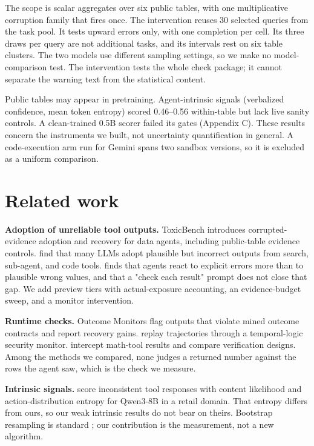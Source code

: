 \documentclass[letterpaper]{article}
\begin{document}
The scope is scalar aggregates over six public tables, with one multiplicative corruption family that fires once. The intervention reuses 30 selected queries from the task pool. It tests upward errors only, with one completion per cell. Its three draws per query are not additional tasks, and its intervals rest on six table clusters. The two models use different sampling settings, so we make no model-comparison test. The intervention tests the whole check package; it cannot separate the warning text from the statistical content.


Public tables may appear in pretraining. Agent-intrinsic signals (verbalized confidence, mean token entropy) scored 0.46--0.56 within-table but lack live sanity controls. A clean-trained 0.5B scorer failed its gates (Appendix C). These results concern the instruments we built, not uncertainty quantification in general. A code-execution arm run for Gemini spans two sandbox versions, so it is excluded as a uniform comparison.


\section{Related work}

\textbf{Adoption of unreliable tool outputs.} ToxicBench \citep{TaoYin2026} introduces corrupted-evidence adoption and recovery for data agents, including public-table evidence controls. \citet{Overreliance} find that many LLMs adopt plausible but incorrect outputs from search, sub-agent, and code tools. \citet{LoudQuietFailures} finds that agents react to explicit errors more than to plausible wrong values, and that a "check each result" prompt does not close that gap. We add preview tiers with actual-exposure accounting, an evidence-budget sweep, and a monitor intervention.


\textbf{Runtime checks.} Outcome Monitors \citep{OutcomeMonitors} flag outputs that violate mined outcome contracts and report recovery gains. \citet{FormalRuntimeVerification} replay trajectories through a temporal-logic security monitor. \citet{MathAgentsCorrupted} intercept math-tool results and compare verification designs. Among the methods we compared, none judges a returned number against the rows the agent saw, which is the check we measure.


\textbf{Intrinsic signals.} \citet{Xu2026} score inconsistent tool responses with content likelihood and action-distribution entropy for Qwen3-8B in a retail domain. That entropy differs from ours, so our weak intrinsic results do not bear on theirs. Bootstrap resampling is standard \citep{Efron1979}; our contribution is the measurement, not a new algorithm.
\end{document}

